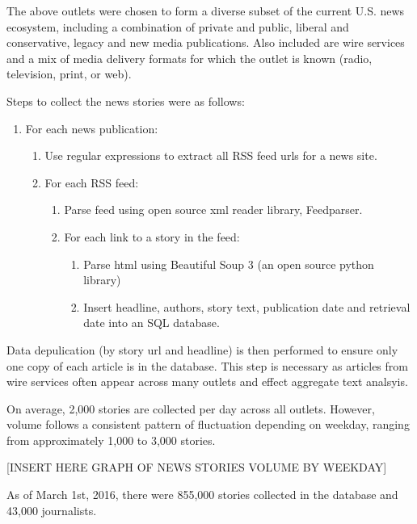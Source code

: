 The above outlets were chosen to form a diverse subset of the current U.S. news ecosystem, including a combination of private and public, liberal and conservative, legacy and new media publications. Also included are wire services and a mix of media delivery formats for which the outlet is known (radio, television, print, or web).  

Steps to collect the news stories were as follows:

 \begin{enumerate}
    \item For each news publication:
    \begin {enumerate}
    \itemsep-1em 
        \item Use regular expressions to extract all RSS feed urls for a news site.
        \item For each RSS feed:
        \begin {enumerate}
        \itemsep-1em 
            \item Parse feed using open source xml reader library, Feedparser.
            \item For each link to a story in the feed:             
            \begin {enumerate}
                \item Parse html using Beautiful Soup 3 (an open source python library)
                \item Insert headline, authors, story text, publication date and retrieval date into an SQL database.

            \end {enumerate}
        \end{enumerate}
    \end{enumerate}
\end{enumerate}

Data depulication (by story url and headline) is then performed to ensure only one copy of each article is in the database. This step is necessary as articles from wire services often appear across many outlets and effect aggregate text analsyis.

On average, 2,000 stories are collected per day across all outlets. However, volume follows a consistent pattern of fluctuation depending on weekday, ranging from approximately 1,000 to 3,000 stories.

[INSERT HERE GRAPH OF NEWS STORIES VOLUME BY WEEKDAY]

As of March 1st, 2016, there were 855,000 stories collected in the database and 43,000 journalists.

